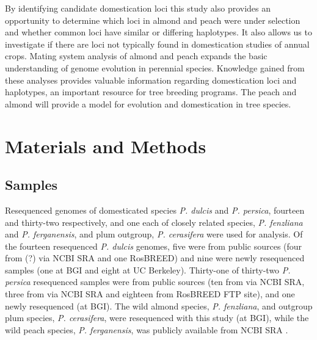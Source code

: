 \documentclass[12pt]{article}
\begin{document}
%
By identifying candidate domestication loci this study also provides an opportunity to determine which loci in almond and peach were under selection and whether common loci have similar or differing haplotypes. 
%
It also allows us to investigate if there are loci not typically found in domestication studies of annual crops. 
%
Mating system analysis of almond and peach expands the basic understanding of genome evolution in perennial species. 
%
Knowledge gained from these analyses provides valuable information regarding domestication loci and haplotypes, an important resource for tree breeding programs.
%
The peach and almond will provide a model for evolution and domestication in tree species.
\\
\section*{Materials and Methods}
%
\subsection*{Samples}
Resequenced genomes of domesticated species \emph{P. dulcis} and \emph{P. persica}, fourteen and thirty-two respectively, and one each of closely related species, \emph{P. fenzliana} and \emph{P. ferganensis}, and plum outgroup, \emph{P. cerasifera} were used for analysis.
%
Of the fourteen resequenced \emph{P. dulcis} genomes, five were from public sources (four from \citealt{koepke2013comparative}(?) via NCBI SRA and one RosBREED) and nine were newly resequenced samples (one at BGI and eight at UC Berkeley).
%
Thirty-one of thirty-two \emph{P. persica} resequenced samples were from public sources (ten from \citealt{verde2013high} via NCBI SRA, three from \citealt{ahmad2011whole} via NCBI SRA and eighteen from RosBREED FTP site),
and one newly resequenced (at BGI).
%
The wild almond species, \emph{P. fenzliana}, and outgroup plum species, \emph{P. cerasifera}, were resequenced with this study (at BGI), while the wild peach species, \emph{P. ferganensis}, was publicly available from NCBI SRA \citep{verde2013high}.\\
%
%
\end{document}
